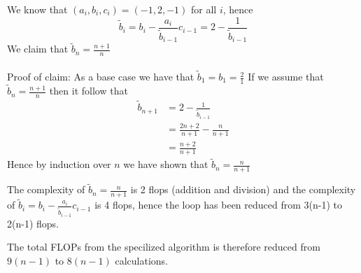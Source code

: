 
We know that $(a_i, b_i, c_i) = (-1,2,-1)$ for all $i$, hence 
$$
    \tilde{b}_i = b_i - \frac{a_i}{\tilde{b}_{i-1}} c_{i-1}
    = 2- \frac{1}{\tilde{b}_{i-1}}
$$
We claim that $\tilde{b}_n = \frac{n+1}{n}$
\\\\
Proof of claim:
As a base case we have that $\tilde{b}_1 = b_1 = \frac{2}{1}$
If we assume that $\tilde{b}_n = \frac{n+1}{n}$ then it follow that
\begin{align*}
    \tilde{b}_{n+1} &= 2- \frac{1}{\tilde{b}_{i-1}} \\
    &= \frac{2n+2}{n+1} - \frac{n}{n+1} \\
    &= \frac{n+2}{n+1}
\end{align*}
Hence by induction over $n$ we have shown that $\tilde{b}_n = \frac{n}{n+1}$

The complexity of $\tilde{b}_n = \frac{n}{n+1}$ is 2 flops (addition and division) and the complexity of $\tilde{b}_i = b_i - \frac{a_i}{\tilde{b}_{i-1}} c_{i-1}$ is 4 flops, hence the loop has been reduced from 3(n-1) to 2(n-1) flops.

The total FLOPs from the specilized algorithm is therefore reduced from $9(n-1)$ to  $8(n-1)$ calculations.

